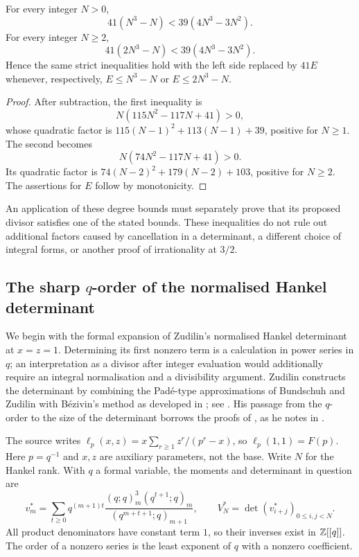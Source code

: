 \documentclass[11pt]{article}
\begin{document}
\begin{theorem}\label{long1049:res:chargeceilings}
For every integer $N>0$,
\[
 41(N^3-N)<39(4N^3-3N^2).
\]
For every integer $N\ge2$,
\[
 41(2N^3-N)<39(4N^3-3N^2).
\]
Hence the same strict inequalities hold with the left side replaced by
$41E$ whenever, respectively, $E\le N^3-N$ or $E\le2N^3-N$.
\end{theorem}

\begin{proof}
After subtraction, the first inequality is
\[
 N(115N^2-117N+41)>0,
\]
whose quadratic factor is $115(N-1)^2+113(N-1)+39$, positive for
$N\ge1$. The second becomes
\[
 N(74N^2-117N+41)>0.
\]
Its quadratic factor is $74(N-2)^2+179(N-2)+103$, positive for
$N\ge2$. The assertions for $E$ follow by monotonicity.
\end{proof}

An application of these degree bounds must separately
prove that its proposed divisor satisfies one of the stated bounds.
These inequalities do not rule out additional factors caused by
cancellation in a determinant, a different choice of integral forms,
or another proof of irrationality at $3/2$.

\subsection{The sharp \texorpdfstring{$q$}{q}-order of the normalised Hankel
determinant}\label{long1049:sec:hankel-order}

We begin with the formal expansion of Zudilin's normalised Hankel
determinant at $x=z=1$. Determining its first nonzero term is a
calculation in power series in $q$; an interpretation as a divisor
after integer evaluation would additionally require an integral
normalisation and a divisibility argument. Zudilin constructs the
determinant by combining the Pad\'e-type approximations of Bundschuh
and Zudilin \cite{bundschuhzudilin2008} with B\'ezivin's method as developed
in \cite{krvz2009}; see \cite[Sec.~2, p.~3]{zudilin2016}.  His passage from the
$q$-order to the size of the determinant borrows the proofs of
\cite[Lemma~2, p.~12, and Prop.~3, p.~13]{krvz2009}, as he notes in
\cite[Sec.~4, p.~7]{zudilin2016}.

The source writes $\ell_p(x,z)=x\sum_{r\ge1}z^r/(p^r-x)$, so
$\ell_p(1,1)=F(p)$. Here $p=q^{-1}$ and $x,z$ are auxiliary
parameters, not the base. Write $N$ for the Hankel rank. With $q$ a
formal variable, the moments and determinant in question are
\[
 v_m^*=\sum_{t\ge0}q^{(m+1)t}
       \frac{(q;q)_m^3(q^{t+1};q)_m}{(q^{m+t+1};q)_{m+1}},
 \qquad V_N^*=\det(v_{i+j}^*)_{0\le i,j<N}.
\]
All product denominators have constant term $1$, so their inverses
exist in $\mathbb{Z}[[q]]$. The order of a nonzero series is the least
exponent of $q$ with a nonzero coefficient.
\end{document}
